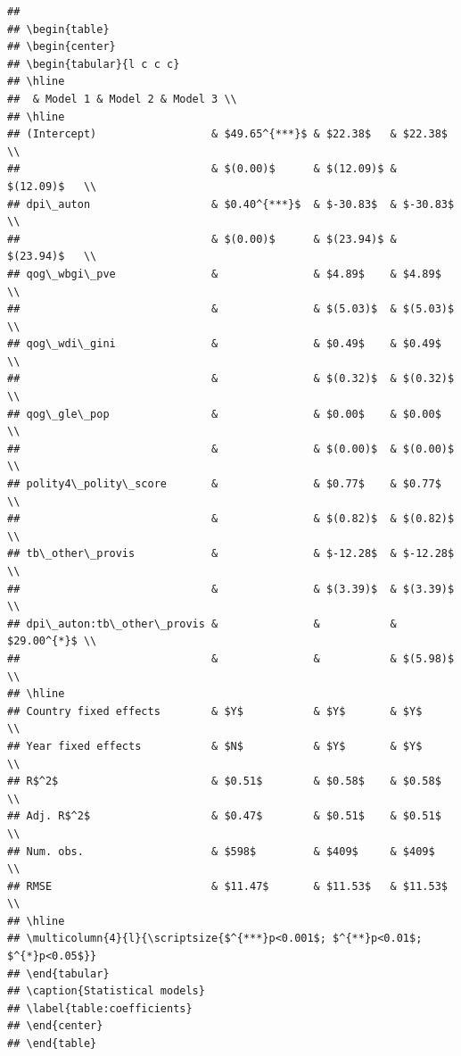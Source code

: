 \documentclass[
]{article}
\begin{document}
\begin{verbatim}
## 
## \begin{table}
## \begin{center}
## \begin{tabular}{l c c c}
## \hline
##  & Model 1 & Model 2 & Model 3 \\
## \hline
## (Intercept)                  & $49.65^{***}$ & $22.38$   & $22.38$     \\
##                              & $(0.00)$      & $(12.09)$ & $(12.09)$   \\
## dpi\_auton                   & $0.40^{***}$  & $-30.83$  & $-30.83$    \\
##                              & $(0.00)$      & $(23.94)$ & $(23.94)$   \\
## qog\_wbgi\_pve               &               & $4.89$    & $4.89$      \\
##                              &               & $(5.03)$  & $(5.03)$    \\
## qog\_wdi\_gini               &               & $0.49$    & $0.49$      \\
##                              &               & $(0.32)$  & $(0.32)$    \\
## qog\_gle\_pop                &               & $0.00$    & $0.00$      \\
##                              &               & $(0.00)$  & $(0.00)$    \\
## polity4\_polity\_score       &               & $0.77$    & $0.77$      \\
##                              &               & $(0.82)$  & $(0.82)$    \\
## tb\_other\_provis            &               & $-12.28$  & $-12.28$    \\
##                              &               & $(3.39)$  & $(3.39)$    \\
## dpi\_auton:tb\_other\_provis &               &           & $29.00^{*}$ \\
##                              &               &           & $(5.98)$    \\
## \hline
## Country fixed effects        & $Y$           & $Y$       & $Y$         \\
## Year fixed effects           & $N$           & $Y$       & $Y$         \\
## R$^2$                        & $0.51$        & $0.58$    & $0.58$      \\
## Adj. R$^2$                   & $0.47$        & $0.51$    & $0.51$      \\
## Num. obs.                    & $598$         & $409$     & $409$       \\
## RMSE                         & $11.47$       & $11.53$   & $11.53$     \\
## \hline
## \multicolumn{4}{l}{\scriptsize{$^{***}p<0.001$; $^{**}p<0.01$; $^{*}p<0.05$}}
## \end{tabular}
## \caption{Statistical models}
## \label{table:coefficients}
## \end{center}
## \end{table}
\end{verbatim}
\end{document}
